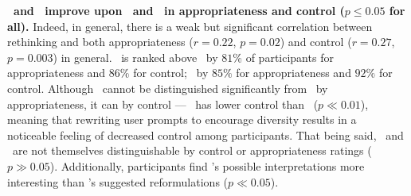 \textbf{~and \agonistic~improve upon \baseline~and \diverse~in appropriateness and control ($p \le 0.05$ for all).}
Indeed, in general, there is a weak but significant correlation between rethinking and both appropriateness ($r = 0.22$, $p = 0.02$) and control ($r = 0.27$, $p = 0.003$) in general.
\agonistic~is ranked above \diverse~by $81\%$ of participants for appropriateness and $86\%$ for control; ~by $85\%$ for appropriateness and $92\%$ for control.
Although \diverse~cannot be distinguished significantly from \baseline~by appropriateness, it can by control --- \diverse~has lower control than \baseline~($p \ll 0.01$), meaning that rewriting user prompts to encourage diversity results in a noticeable feeling of decreased control among participants.
That being said, \agonistic~and ~are not themselves distinguishable by control or appropriateness ratings ($p \gg 0.05$).
Additionally, participants find \agonistic's possible interpretations more interesting than 's suggested reformulations ($p \ll 0.05$).






